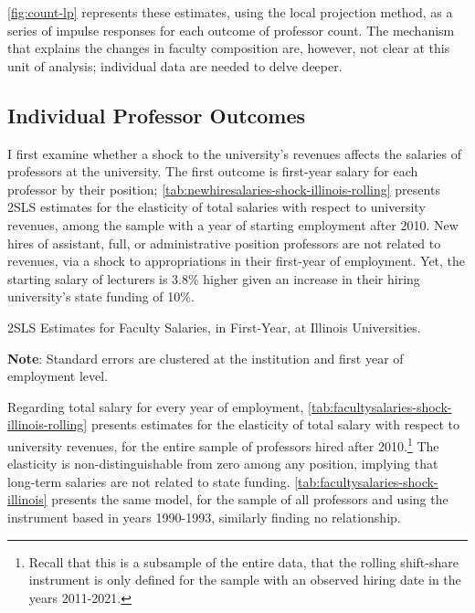 \autoref{fig:count-lp} represents these estimates, using the local projection method, as a series of impulse responses for each outcome of professor count.
The mechanism that explains the changes in faculty composition are, however, not clear at this unit of analysis; individual data are needed to delve deeper.

\subsection{Individual Professor Outcomes}

I first examine whether a shock to the university's revenues affects the salaries of professors at the university.
The first outcome is first-year salary for each professor by their position;
\autoref{tab:newhiresalaries-shock-illinois-rolling} presents 2SLS estimates for the elasticity of total salaries with respect to university revenues, among the sample with a year of starting employment after 2010.
New hires of assistant, full, or administrative position professors are not related to revenues, via a shock to appropriations in their first-year of employment.
Yet, the starting salary of lecturers is 3.8\% higher given an increase in their hiring university's state funding of 10\%.

\begin{table}[h!]
    \singlespacing
    \centering
    \caption{2SLS Estimates for Faculty Salaries, in First-Year, at Illinois Universities.}
    \makebox[\textwidth][c]{}
    \begin{flushleft}
        \footnotesize
        \textbf{Note}: Standard errors are clustered at the institution and first year of employment level. 
    \end{flushleft}
    \label{tab:newhiresalaries-shock-illinois-rolling}
\end{table}

Regarding total salary for every year of employment, \autoref{tab:facultysalaries-shock-illinois-rolling} presents estimates for the elasticity of total salary with respect to university revenues, for the entire sample of professors hired after 2010.\footnote{
    Recall that this is a subsample of the entire data, that the rolling shift-share instrument is only defined for the sample with an observed hiring date in the years 2011-2021.
}
The elasticity is non-distinguishable from zero among any position, implying that long-term salaries are not related to state funding.
\autoref{tab:facultysalaries-shock-illinois} presents the same model, for the sample of all professors and using the instrument based in years 1990-1993, similarly finding no relationship.

